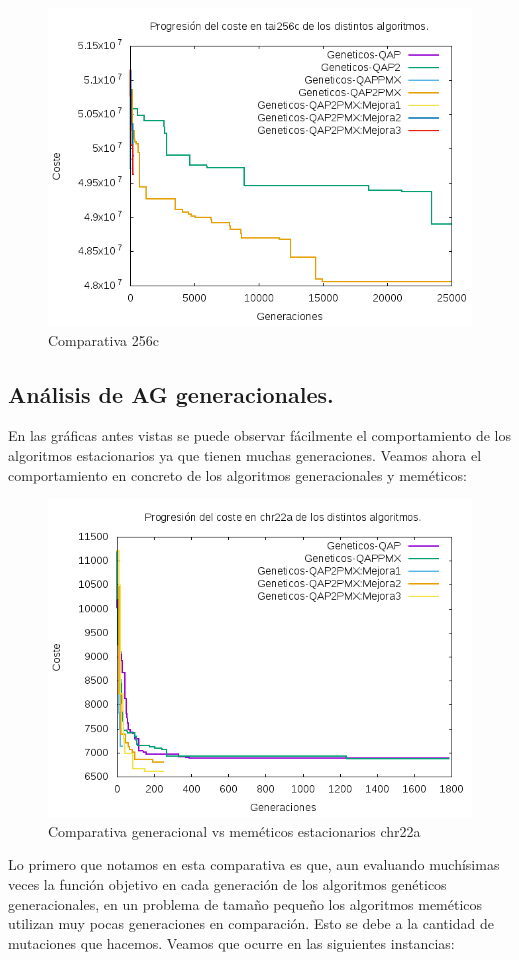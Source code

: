 \begin{figure}[H]
\centering
\includegraphics[width=0.7\linewidth]{graficos/comparativatai256c}
\caption[]{Comparativa 256c}
\label{fig:comparativatai256c}
\end{figure}

\subsection{Análisis de AG generacionales.}

En las gráficas antes vistas se puede observar fácilmente el comportamiento de los algoritmos estacionarios ya que tienen muchas generaciones. Veamos ahora el comportamiento en concreto de los algoritmos generacionales y meméticos:

\begin{figure}[H]
\centering
\includegraphics[width=0.7\linewidth]{graficos/comparativaGeneracionalchr22a}
\caption{Comparativa generacional vs meméticos estacionarios chr22a}
\label{fig:comparativaGeneracionalchr22a}
\end{figure}

Lo primero que notamos en esta comparativa es que, aun evaluando muchísimas veces la función objetivo en cada generación de los algoritmos genéticos generacionales, en un problema de tamaño pequeño los algoritmos meméticos utilizan muy pocas generaciones en comparación. Esto se debe a la cantidad de mutaciones que hacemos. Veamos que ocurre en las siguientes instancias:\\

